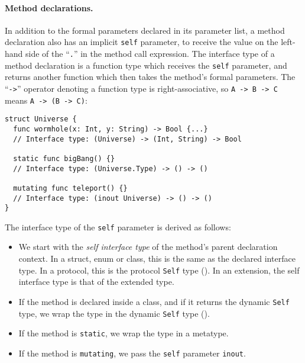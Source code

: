 \documentclass[../generics]{subfiles}
\begin{document}
\paragraph{Method declarations.}
In addition to the formal parameters declared in its parameter list, a method declaration also has an implicit \texttt{self} parameter, to receive the value on the left-hand side of the ``\texttt{.}'' in the method call expression. The interface type of a method declaration is a function type which receives the \texttt{self} parameter, and returns another function which then takes the method's formal parameters. The ``\texttt{->}'' operator denoting a function type is right-associative, so \verb|A -> B -> C| means \verb|A -> (B -> C)|:
\begin{Verbatim}
struct Universe {
  func wormhole(x: Int, y: String) -> Bool {...}
  // Interface type: (Universe) -> (Int, String) -> Bool

  static func bigBang() {}
  // Interface type: (Universe.Type) -> () -> ()

  mutating func teleport() {}
  // Interface type: (inout Universe) -> () -> ()
}
\end{Verbatim}
The interface type of the \texttt{self} parameter is derived as follows:
\begin{itemize}
\item We start with the \emph{self interface type} of the method's parent declaration context. In a struct, enum or class, this is the same as the declared interface type. In a protocol, this is the protocol \texttt{Self} type (). In an extension, the self interface type is that of the extended type.

\item If the method is declared inside a class, and if it returns the dynamic \texttt{Self} type, we wrap the type in the dynamic \texttt{Self} type ().

\item If the method is \texttt{static}, we wrap the type in a metatype.

\item If the method is \texttt{mutating}, we pass the \texttt{self} parameter \texttt{inout}.

\end{itemize}
\end{document}
